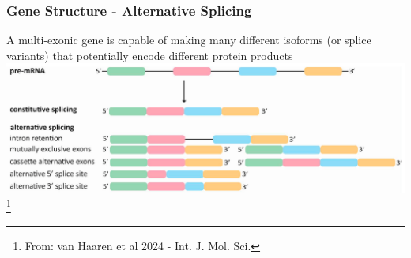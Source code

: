 \documentclass{beamer}
\newcommand\blfootnote[1]{%
	\begingroup
	\renewcommand\thefootnote{}\footnote{#1}%
	\addtocounter{footnote}{-1}%
	\endgroup
}
\begin{document}
\begin{frame}
	\frametitle{Gene Structure - Alternative Splicing}
	
\scriptsize
	A multi-exonic gene is capable of making many different isoforms (or splice variants) that potentially encode different protein products\\
	\centering	\includegraphics[keepaspectratio, width  = \textwidth]{img/altSplicing}\\ 
	\blfootnote{From: van Haaren et al 2024 - Int. J. Mol. Sci.} 
	
\end{frame}
\end{document}
